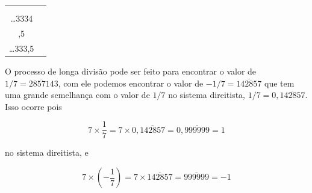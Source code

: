\documentclass{report}
\newcommand*{\carry}[1][1]{\overset{#1}}
\theoremstyle{definition}
\begin{document}
\begin{tabular*}{330pt}{c c}

\begin{minipage}{150pt}
\[
    \begin{array}{@{}B1}
                \ldots \carry 6 \carry 6 \carry 6 7\\
                {} \times 2 \\ \hline
                \ldots 3334
    \end{array}
\]

\begin{equation*}
    \implies \frac{2}{3} = 2 \times \frac{1}{3} = \overline3 4
\end{equation*}
\end{minipage}

    &

\begin{minipage}{150pt}
\[
    \begin{array}{@{}B1}
                \ldots \carry[3] 6 \carry[3] 6 \carry[3] 6 7\\
                {} \times 0,5 \\ \hline
                \ldots 333,5
    \end{array}
\]

\begin{equation*}
    \implies \frac{1}{6} = \frac{1}{2} \times \frac{1}{3} = \overline3,5
\end{equation*}
\end{minipage}

\end{tabular*}

\bigskip

O processo de longa divisão pode ser feito para encontrar o valor de $1/7=\overline{285714}3$, com ele podemos encontrar o valor de $-1/7=\overline{142857}$ que tem uma grande semelhança com o valor de $1/7$ no sistema direitista, $1/7=0,\overline{142857}$. Isso ocorre pois

\begin{equation*}
    7 \times \frac{1}{7} = 7 \times 0,\overline{142857} = 0,\overline{999999} = 1
\end{equation*}

no sistema direitista, e

\begin{equation*}
    7 \times \left( -\frac{1}{7} \right) = 7 \times \overline{142857} = \overline{999999} = -1
\end{equation*}
\end{document}
